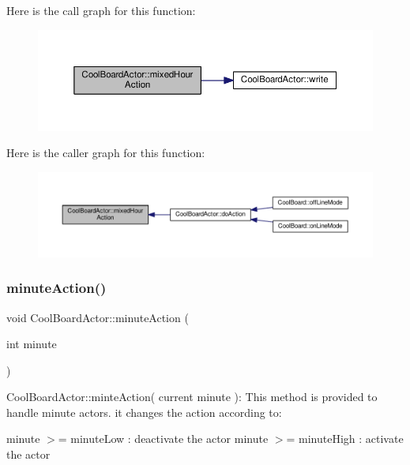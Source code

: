Here is the call graph for this function\+:
\nopagebreak
\begin{figure}[H]
\begin{center}
\leavevmode
\includegraphics[width=350pt]{dc/d69/class_cool_board_actor_a6d93a24502c56ced2ef7675c913a276b_cgraph}
\end{center}
\end{figure}
Here is the caller graph for this function\+:
\nopagebreak
\begin{figure}[H]
\begin{center}
\leavevmode
\includegraphics[width=350pt]{dc/d69/class_cool_board_actor_a6d93a24502c56ced2ef7675c913a276b_icgraph}
\end{center}
\end{figure}
\mbox{\label{class_cool_board_actor_af000944ce0b9abb9c6ee4b8fe839fb36}} 
\subsubsection{\texorpdfstring{minute\+Action()}{minuteAction()}}
{\footnotesize\ttfamily void Cool\+Board\+Actor\+::minute\+Action (\begin{DoxyParamCaption}\item[{int}]{minute }\end{DoxyParamCaption})}

Cool\+Board\+Actor\+::minte\+Action( current minute )\+: This method is provided to handle minute actors. it changes the action according to\+:

minute $>$= minute\+Low \+: deactivate the actor minute $>$= minute\+High \+: activate the actor 

